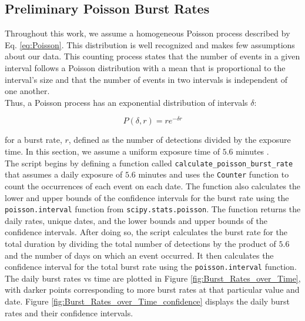 \documentclass[twocolumn]{aastex631}
\begin{document}
\subsection{Preliminary Poisson Burst Rates}

\indent Throughout this work, we assume a homogeneous Poisson process described by Eq. \ref{eq:Poisson}. This distribution is well recognized and makes few assumptions about our data. This counting process states that the number of events in a given interval follows a Poisson distribution with a mean that is proportional to the interval's size and that the number of events in two intervals is independent of one another.\\
\indent Thus, a Poisson process has an exponential distribution of intervals $\delta$:

\begin{equation}
P(\delta,r)=re^{-\delta r} \label{eq:Poisson}
\end{equation}

for a burst rate, $r$, defined as the number of detections divided by the exposure time. In this section, we assume a uniform exposure time of $5.6$ minutes \citep{good2023nondetection}.\\
\indent The script begins by defining a function called \texttt{calculate{\_}poisson{\_}burst{\_}rate} that assumes a daily exposure of $5.6$ minutes and uses the \texttt{Counter} function to count the occurrences of each event on each date. The function also calculates the lower and upper bounds of the confidence intervals for the burst rate using the \texttt{poisson.interval} function from \texttt{scipy.stats.poisson}. The function returns the daily rates, unique dates, and the lower bounds and upper bounds of the confidence intervals. After doing so, the script calculates the burst rate for the total duration by dividing the total number of detections by the product of $5.6$ and the number of days on which an event occurred. It then calculates the confidence interval for the total burst rate using the \texttt{poisson.interval} function. The daily burst rates vs time are plotted in Figure \ref{fig:Burst_Rates_over_Time}, with darker points corresponding to more burst rates at that particular value and date. Figure \ref{fig:Burst_Rates_over_Time_confidence} displays the daily burst rates and their confidence intervals. 
\end{document}
